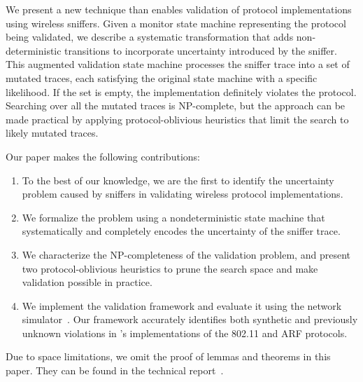 We present a new technique than enables validation of protocol implementations using
wireless sniffers. Given a monitor state machine representing the protocol being
validated, we describe a systematic transformation that adds non-deterministic
transitions to incorporate uncertainty introduced by the sniffer. This
augmented validation state machine processes the sniffer trace into a set of
mutated traces, each satisfying the original state machine with a specific
likelihood. If the set is empty, the implementation definitely violates the
protocol. Searching over all the mutated traces is NP-complete, but the approach
can be made practical by applying protocol-oblivious heuristics that limit the
search to likely mutated traces.

Our paper makes the following contributions:
\begin{enumerate}
  \item To the best of our knowledge, we are the first to identify the
    uncertainty problem caused by sniffers in validating wireless protocol
    implementations.
  \item We formalize the problem using a nondeterministic state machine that
    systematically and completely encodes the uncertainty of the
    sniffer trace.
  \item We characterize the NP-completeness of the validation problem, and
    present two protocol-oblivious heuristics to prune the search space and make
    validation possible in practice.
  \item We implement the validation framework and evaluate it using the \ns{}
    network simulator~\cite{riley2010ns}. Our framework accurately identifies
    both synthetic and previously unknown violations in \ns{}'s implementations
    of the 802.11 and ARF protocols.
\end{enumerate}

Due to space limitations, we omit the proof of lemmas and theorems in this
paper. They can be found in the technical report~\cite{msr_tech_report}.

\begin{comment}
The rest of this paper is organized as follows.
We motivate the uncertainty problem in Section~\ref{sec:model}.
We then formally describe the problem in Section~\ref{sec:framework},
including the completeness of the augmentation (\S~\ref{subsec:augment}),
hardness analysis (\S~\ref{subsec:hard}) and search algorithms
(\S~\ref{subsec:search}).
We continue by evaluating our framework through two case studies in
Section~\ref{sec:case}.  Finally, we present related works in
Section~\ref{sec:related} and concludes in Section~\ref{sec:conclusion}.
\end{comment}
